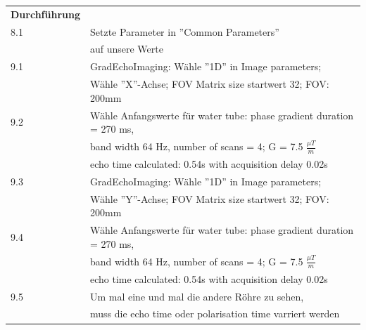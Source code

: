 \begin{tabular}{ll}
    \textbf{Durchführung} & \\

    8.1 & Setzte Parameter in ''Common Parameters''  \\

        &  auf unsere Werte \\

    9.1 & GradEchoImaging: Wähle  ''1D'' in Image parameters;  \\

        & Wähle ''X''-Achse; FOV Matrix size startwert 32; FOV: 200mm \\

    9.2 & Wähle Anfangswerte für water tube: phase gradient duration = 270 ms,  \\

        & band width 64 Hz, number of scans = 4; G = 7.5 $\frac{\mu T}{m}$ \\

        & echo time calculated: 0.54s with acquisition delay 0.02s \\

    9.3 & GradEchoImaging: Wähle  ''1D'' in Image parameters;  \\

        & Wähle ''Y''-Achse; FOV Matrix size startwert 32; FOV: 200mm \\

    9.4 & Wähle Anfangswerte für water tube: phase gradient duration = 270 ms,  \\

        & band width 64 Hz, number of scans = 4; G = 7.5 $\frac{\mu T}{m}$ \\

        & echo time calculated: 0.54s with acquisition delay 0.02s \\

    9.5 &  Um mal eine und mal die andere Röhre zu sehen, \\
    & muss die echo time oder polarisation time varriert werden \\

\end{tabular}  

